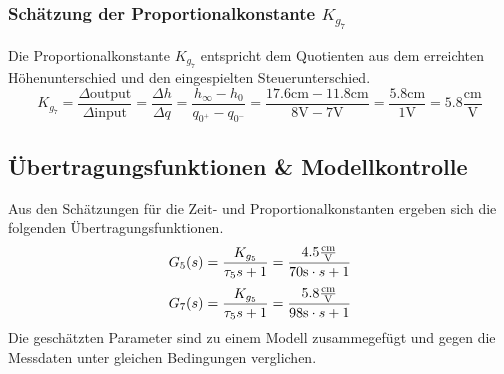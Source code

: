 \subsubsection{Schätzung der Proportionalkonstante $K_{g_7}$}
Die Proportionalkonstante $K_{g_7}$ entspricht dem Quotienten aus dem
erreichten Höhenunterschied und den eingespielten Steuerunterschied.
\[
	K_{g_7}
	= \frac{\Delta \text{output}}{\Delta \text{input}}
	= \frac{\Delta h}{\Delta q}
	= \frac{h_\infty - h_0}{q_{0^+} - q_{0^-}}
	= \frac{17.6\si{\centi\meter} - 11.8\si{\centi\meter}}{8\si{\volt}
		-  7\si{\volt}}
	= \frac{5.8\si{\centi\meter}}{1\si{\volt}}
	= 5.8 \frac{\si{\centi\meter}}{\si{\volt}}
\]

\subsection{Übertragungsfunktionen \& Modellkontrolle}
Aus den Schätzungen für die Zeit- und Proportionalkonstanten ergeben sich
die folgenden Übertragungsfunktionen.
\[
	G_5(s) 
	= \frac{K_{g_5}}{\tau_5 s + 1} 
	= \frac{4.5\si[per-mode = fraction]{\centi\meter\per\volt}
		}{70\si{\second} \cdot s + 1}
\]
\[
	G_7(s) 
	= \frac{K_{g_5}}{\tau_5 s + 1} 
	= \frac{5.8\si[per-mode = fraction]{\centi\meter\per\volt}
		}{98\si{\second} \cdot s + 1}
\]
Die geschätzten Parameter sind zu einem Modell zusammegefügt und gegen die
Messdaten unter gleichen Bedingungen verglichen.
